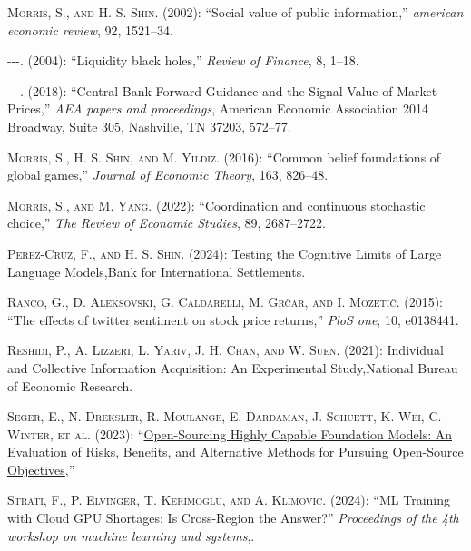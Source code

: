 \documentclass[
]{article}
\newlength{\cslhangindent}
\newlength{\cslentryspacingunit} %
\newenvironment{CSLReferences}[2] %
 {%
  \setlength{\parindent}{0pt}
  \ifodd #1
  \let\oldpar\par
  \def\par{\hangindent=\cslhangindent\oldpar}
  \fi
  \setlength{\parskip}{#2\cslentryspacingunit}
 }%
 {}
\theoremstyle{plain}
\theoremstyle{definition}
\theoremstyle{remark}
\begin{document}
\begin{CSLReferences}{1}{0}
\leavevmode{}%
\textsc{Morris, S., and H. S. Shin}. (2002): {``Social value of public
information,''} \emph{american economic review}, 92, 1521--34.

\leavevmode{}%
\textsc{-\/-\/-}. (2004): {``Liquidity black holes,''} \emph{Review of
Finance}, 8, 1--18.

\leavevmode{}%
\textsc{-\/-\/-}. (2018): {``Central Bank Forward Guidance and the
Signal Value of Market Prices,''} \emph{AEA papers and proceedings},
American Economic Association 2014 Broadway, Suite 305, Nashville, TN
37203, 572--77.

\leavevmode{}%
\textsc{Morris, S., H. S. Shin, and M. Yildiz}. (2016): {``Common belief
foundations of global games,''} \emph{Journal of Economic Theory}, 163,
826--48.

\leavevmode{}%
\textsc{Morris, S., and M. Yang}. (2022): {``Coordination and continuous
stochastic choice,''} \emph{The Review of Economic Studies}, 89,
2687--2722.

\leavevmode{}%
\textsc{Perez-Cruz, F., and H. S. Shin}. (2024): Testing the Cognitive
Limits of Large Language Models,Bank for International Settlements.

\leavevmode{}%
\textsc{Ranco, G., D. Aleksovski, G. Caldarelli, M. Grčar, and I.
Mozetič}. (2015): {``The effects of twitter sentiment on stock price
returns,''} \emph{PloS one}, 10, e0138441.

\leavevmode{}%
\textsc{Reshidi, P., A. Lizzeri, L. Yariv, J. H. Chan, and W. Suen}.
(2021): Individual and Collective Information Acquisition: An
Experimental Study,National Bureau of Economic Research.

\leavevmode{}%
\textsc{Seger, E., N. Dreksler, R. Moulange, E. Dardaman, J. Schuett, K.
Wei, C. Winter, et al.} (2023):
{``\href{https://arxiv.org/abs/2311.09227}{Open-Sourcing Highly Capable
Foundation Models: An Evaluation of Risks, Benefits, and Alternative
Methods for Pursuing Open-Source Objectives},''}

\leavevmode{}%
\textsc{Strati, F., P. Elvinger, T. Kerimoglu, and A. Klimovic}. (2024):
{``ML Training with Cloud GPU Shortages: Is Cross-Region the Answer?''}
\emph{Proceedings of the 4th workshop on machine learning and systems},.


\end{CSLReferences}
\end{document}
